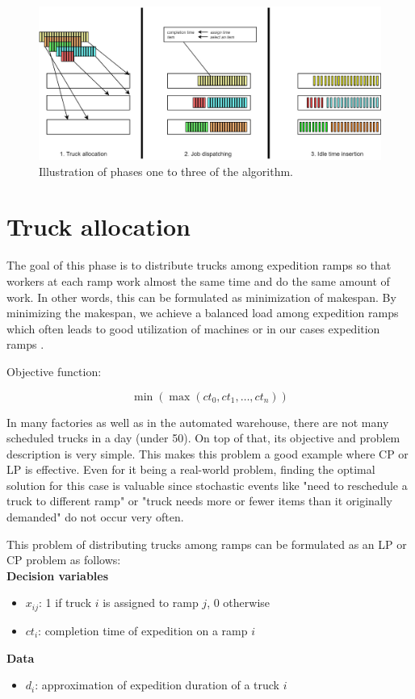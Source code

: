 \documentclass{ctuthesis}
\begin{document}
\begin{figure}[h]
\includegraphics[width=0.8\linewidth]{algo.jpg}
\caption{Illustration of phases one to three of the algorithm.}
\end{figure}

\section{Truck allocation}

The goal of this phase is to distribute trucks among expedition ramps so that workers at each ramp work almost the same time and do the same amount of work. In other words, this can be formulated as minimization of makespan. By minimizing the makespan, we achieve a balanced load among expedition ramps which often leads to good utilization of machines or in our cases expedition ramps \cite{pinedo}. 

 Objective function:
 
 \begin{equation}
     \min(\max(ct_0, ct_1, \ldots, ct_n))
 \end{equation}

In many factories as well as in the automated warehouse, there are not many scheduled trucks in a day (under 50). On top of that, its objective and problem description is very simple. This makes this problem a good example where CP or LP is effective. Even for it being a real-world problem, finding the optimal solution for this case is valuable since stochastic events like "need to reschedule a truck to different ramp" or "truck needs more or fewer items than it originally demanded" do not occur very often.

This problem of distributing trucks among ramps can be formulated as an LP or CP problem as follows:\\

\noindent \textbf{Decision variables}

\begin{itemize}
\item $x_{ij}$: 1 if truck $i$ is assigned to ramp $j$, 0 otherwise
\item$ct_i$: completion time of expedition on a ramp $i$
\end{itemize}
\textbf{Data}
\begin{itemize}
\item$d_i$: approximation of expedition duration of a truck $i$
\end{itemize}
\end{document}
